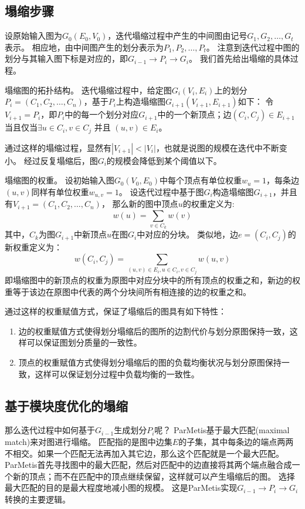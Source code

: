 \documentclass[master]{njuthesis}
\begin{document}
\subsection{塌缩步骤}
设原始输入图为$G_{0}(E_0,V_0)$，迭代塌缩过程中产生的中间图由记号$G_1, G_2, \dots, G_t$表示。
相应地，由中间图产生的划分表示为$P_1, P_2, \dots, P_{t}$。
注意到迭代过程中图的划分与其输入图下标是对应的，即$G_{i-1} \rightarrow P_i \rightarrow G_i$。
我们首先给出塌缩的具体过程。
\begin{definition}
塌缩图的拓扑结构。 迭代塌缩过程中，给定图$G_i(V_i, E_i)$上的划分$P_i=(C_1, C_2, \dots, C_n)$，基于$P_i$上构造塌缩图$G_{i+1}(V_{i+1}, E_{i+1})$如下：
 令$V_{i+1} = P_i$，即$P_i$中的每一个划分对应$G_{i+1}$中的一个新顶点；边$(C_i, C_j) \in E_{i+1}$当且仅当$\exists
 u \in C_i, v \in C_j$ 并且 $(u, v) \in E_i$。
\end{definition}
通过这样的塌缩过程，显然有$|V_{i+1}| < |V_i|$，也就是说图的规模在迭代中不断变小。
经过反复塌缩后，图$G_i$的规模会降低到某个阈值以下。
\begin{definition}
塌缩图的权重。 设初始输入图$G_{0}(V_0,E_0)$中每个顶点有单位权重$w_u=1$，每条边$(u,v)$同样有单位权重$w_{u,v}=1$。
设迭代过程中基于图$G_i$构造塌缩图$G_{i+1}$，并且有$V_{i+1}=(C_1, C_2, \dots, C_n)$，
那么新的图中顶点$u$的权重定义为:
\begin{equation}
\label{eq:vertex_weight}
w(u) = \sum\limits_{v \in C_k} w(v)
\end{equation}
其中，$C_k$为图$G_{i+1}$中新顶点$u$在图$G_i$中对应的分块。
类似地，边$e=(C_i, C_j)$的新权重定义为：
 \begin{equation}
w(C_i, C_j) = \sum\limits_{(u,v) \in E_i, u \in C_i, v \in C_j} w(u,v)
\end{equation}
即塌缩图中的新顶点的权重为原图中对应分块中的所有顶点的权重之和，新边的权重等于该边在原图中代表的两个分块间所有相连接的边的权重之和。
\end{definition}
通过这样的权重赋值方式，保证了塌缩后的图具有如下特性：
\begin{enumerate}
 \item 边的权重赋值方式使得划分塌缩后的图所的边割代价与划分原图保持一致，这样可以保证图划分质量的一致性。
 \item 顶点的权重赋值方式使得划分塌缩后的图的负载均衡状况与划分原图保持一致，这样可以保证划分过程中负载均衡的一致性。
\end{enumerate}
\subsection{基于模块度优化的塌缩}
那么迭代过程中如何基于$G_{i-1}$生成划分$P_i$呢？
ParMetis\cite{karypis1998parallel}基于最大匹配(maximal match)来对图进行塌缩。
匹配指的是图中边集$E$的子集，其中每条边的端点两两不相交。如果一个匹配无法再加入其它边，那么这个匹配就是一个最大匹配。
ParMetis首先寻找图中的最大匹配，然后对匹配中的边直接将其两个端点融合成一个新的顶点；而不在匹配中的顶点继续保留，这样就可以产生塌缩后的图。
选择最大匹配的目的是最大程度地减小图的规模。
这是ParMetis实现$G_{i-1} \rightarrow P_i \rightarrow G_i$转换的主要逻辑。	
\end{document}
